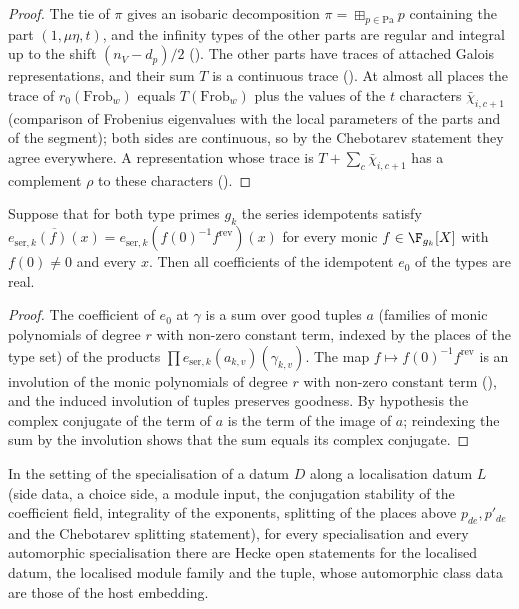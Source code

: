 \begin{proof}
The tie of $\pi$ gives an isobaric decomposition $\pi=\boxplus_{p\in\mathrm{Pa}}p$ containing the part $(1,\mu\eta,t)$, and the infinity types
of the other parts are regular and integral up to the shift $(n_V-d_p)/2$ (). The other
parts have traces of attached Galois representations, and their sum $T$ is a continuous trace
(). At almost all places the trace of $r_0(\mathrm{Frob}_w)$ equals $T(\mathrm{Frob}_w)$ plus
the values of the $t$ characters $\bar\chi_{i,c+1}$ (comparison of Frobenius eigenvalues with the local parameters of the parts and of
the segment); both sides are continuous, so by the Chebotarev statement they agree everywhere. A representation whose trace is
$T+\sum_c\bar\chi_{i,c+1}$ has a complement $\rho$ to these characters ().
\end{proof}

\begin{lemma}\label{pf:stageU:starcoeff}
Suppose that for both type primes $g_k$ the series idempotents satisfy $\overline{e_{\mathrm{ser},k}(f)(x)}=e_{\mathrm{ser},k}(f(0)^{-1}f^{\mathrm{rev}})(x)$
for every monic $f\in\F_{g_k}[X]$ with $f(0)\ne0$ and every $x$. Then all coefficients of the idempotent $e_0$ of the types are real.
\end{lemma}

\begin{proof}
The coefficient of $e_0$ at $\gamma$ is a sum over good tuples $a$ (families of monic polynomials of degree $r$ with non-zero constant
term, indexed by the places of the type set) of the products $\prod e_{\mathrm{ser},k}(a_{k,v})(\gamma_{k,v})$. The map $f\mapsto
f(0)^{-1}f^{\mathrm{rev}}$ is an involution of the monic polynomials of degree $r$ with non-zero constant term
(), and the induced involution of tuples preserves goodness. By hypothesis the complex
conjugate of the term of $a$ is the term of the image of $a$; reindexing the sum by the involution shows that the sum equals its
complex conjugate.
\end{proof}

\begin{lemma}\label{pf:stageU:heckeopen}
In the setting of the specialisation of a datum $D$ along a localisation datum $L$ (side data, a choice side, a module input, the
conjugation stability of the coefficient field, integrality of the exponents, splitting of the places above $p_{de},p'_{de}$ and the
Chebotarev splitting statement), for every specialisation and every automorphic specialisation there are Hecke open statements for
the localised datum, the localised module family and the tuple, whose automorphic class data are those of the host embedding.
\end{lemma}

